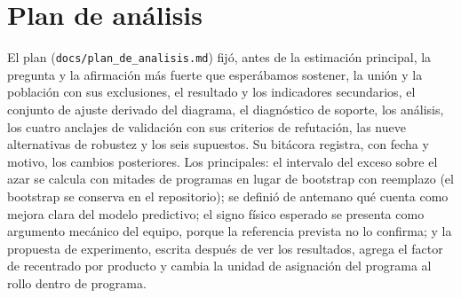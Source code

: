 \begin{table}[!h]
\centering
\caption{Resumen de los contrastes por familia. Mín.\ y Máx.: rango de las estimaciones en la familia. IC excluye 0:
cuántos intervalos de 95\,\% excluyen el cero. $q_{\min}$: menor valor $q$ de Benjamini--Hochberg.}
\label{tab:contrastes}
\footnotesize

\end{table}

\section{Plan de análisis}
\label{sec:anexo-plan}
El plan (\texttt{docs/plan\_de\_analisis.md}) fijó, antes de la estimación principal, la pregunta y la afirmación más fuerte
que esperábamos sostener, la unión y la población con sus exclusiones, el resultado y los indicadores secundarios, el
conjunto de ajuste derivado del diagrama, el diagnóstico de soporte, los análisis, los cuatro anclajes de validación
con sus criterios de refutación, las nueve alternativas de robustez y los seis supuestos. Su bitácora registra, con fecha
y motivo, los cambios posteriores. Los principales: el intervalo del exceso sobre el azar se calcula con mitades de
programas en lugar de bootstrap con reemplazo (el bootstrap se conserva en el repositorio); se definió de antemano qué
cuenta como mejora clara del modelo predictivo; el signo físico esperado se presenta como argumento mecánico del equipo,
porque la referencia prevista no lo confirma; y la propuesta de experimento, escrita después de ver los resultados,
agrega el factor de recentrado por producto y cambia la unidad de asignación del programa al rollo dentro de programa.
